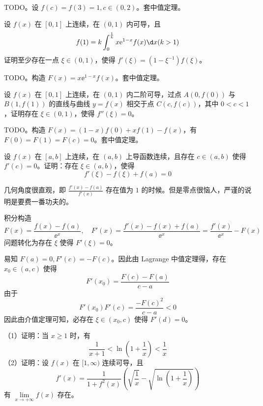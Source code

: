 \begin{solution}
	TODO。设 $f(c) = f(3) = 1, c \in (0, 2)$。套中值定理。
\end{solution}

\begin{problem}[000012]
设 $f(x)$ 在 $[0, 1]$ 上连续，在 $(0, 1)$ 内可导，且
\[ f(1) = k \int_{0}^{\frac{1}{k}} x \ee^{1-x} f(x) \d x (k > 1) \]
证明至少存在一点 $\xi \in (0, 1)$，使得 $f'(\xi) = (1 - \xi^{-1})f(\xi)$。
\end{problem}

\begin{solution}
	TODO。构造 $F(x) = x \ee^{1-x} f(x)$。套中值定理。
\end{solution}

\begin{problem}[000013]
设 $f(x)$ 在 $[0, 1]$ 上连续，在 $(0, 1)$ 内二阶可导，过点 $A(0, f(0))$ 与 $B(1, f(1))$ 的直线与曲线 $y=f(x)$ 相交于点 $C(c, f(c))$，其中 $0 < c < 1$，证明存在 $\xi \in (0, 1)$，使得 $f''(\xi) = 0$。
\end{problem}

\begin{solution}
	TODO。构造 $F(x) = (1-x)f(0) + xf(1) - f(x)$，有 $F(0) = F(1) = F(c) = 0$。套中值定理。
\end{solution}

\begin{problem}[000016]
设 $f(x)$ 在 $[a, b]$ 上连续，在 $(a, b)$ 上导函数连续，且存在 $c \in (a, b)$ 使得 $f'(c) = 0$。证明：存在 $\xi \in (a, b)$，使得
\[ f'(\xi) - f(\xi) + f(a) = 0 \]
\end{problem}

\begin{solution}
	几何角度很直观，即 $\frac{f'(x) - f(a)}{f'(x)}$ 存在值为 $1$ 的时候。但是零点很恼人，严谨的说明是要费一番功夫的。

	积分构造
	\[ F(x) = \frac{f(x) - f(a)}{\ee^x}, \quad F'(x) = \frac{f'(x) - f(x) + f(a)}{\ee^x} = \frac{f'(x)}{\ee^x} - F(x) \]
	问题转化为存在 $\xi$ 使得 $F'(\xi) = 0$。

	易知 $F(a) = 0, F'(c) = -F(c)$。因此由 Lagrange 中值定理得，存在 $x_0 \in (a, c)$ 使得
	\[ F'(x_0) = \frac{F(c) - F(a)}{c - a} \]
	由于
	\[ F'(x_0) F'(c) = \frac{-F(c)^2}{c- a} < 0 \]
	因此由介值定理可知，必存在 $\xi \in (x_0, c)$ 使得 $F'(d) = 0$。
\end{solution}

\begin{problem}[000018]
（1）证明：当 $x \geqslant 1$ 时，有
\[ \frac{1}{x+1} < \ln\left(1 + \frac{1}{x}\right) < \frac{1}{x} \]
（2）证明：设 $f(x)$ 在 $[1, \infty)$ 连续可导，且
\[ f'(x) = \frac{1}{1 + f^2(x)} \left( \sqrt{\frac{1}{x}} - \sqrt{\ln\left(1 + \frac{1}{x}\right)} \right) \]
有 $\lim\limits_{x \to +\infty} f(x)$ 存在。
\end{problem}

